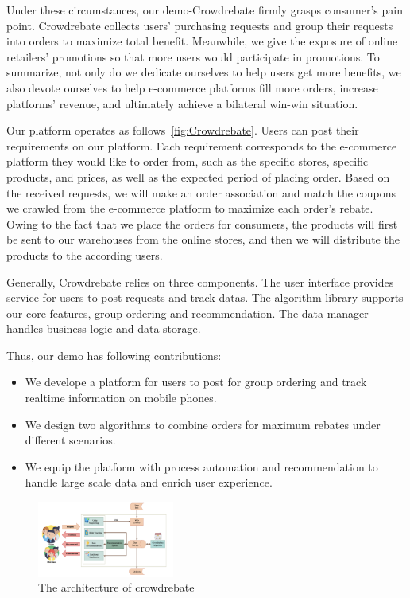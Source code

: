 Under these circumstances, our demo-Crowdrebate firmly grasps consumer's pain point. Crowdrebate collects users’
purchasing requests and group their requests into orders to
maximize total benefit. Meanwhile, we give the exposure of online retailers' promotions so that more users would participate in promotions. To summarize, not only do we dedicate ourselves to help users get more benefits, we also devote ourselves to help e-commerce platforms fill more orders, increase platforms’ revenue, and ultimately achieve a bilateral win-win situation.

Our platform operates as follows~\ref{fig:Crowdrebate}. Users can post their requirements on our platform. Each requirement corresponds to the e-commerce platform they would like to order from, such as the specific stores, specific products, and prices, as well as the expected period of placing order. Based on the received requests, we will make an order association and match the coupons we crawled from the e-commerce platform to maximize each order's rebate. Owing to the fact that we place the orders for consumers, the products will first be sent to our warehouses from the online stores, and then we will distribute the products to the according users.

Generally, Crowdrebate relies on three components. The user interface provides service for users to post requests and track datas. The algorithm library supports our core features, group ordering and recommendation. The data manager handles business logic and data storage.

Thus, our demo has following contributions:
\begin{itemize}
	\item We develope a platform for users to post for group ordering and track realtime information on mobile phones.
	\item We design two algorithms to combine orders for maximum rebates under different scenarios.
	\item We equip the platform with process automation and recommendation to handle large scale data and enrich user experience.
\end{itemize}
\begin{figure}[t] 
	\centering %
	\includegraphics[width=0.4\textwidth]{../figure/ar.png} %
	\caption{The architecture of crowdrebate} %
	\label{fig:ar} %
\end{figure}

